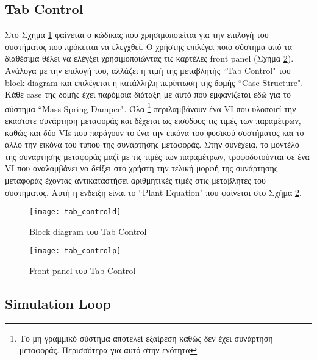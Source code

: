 \subsection{Tab Control}

Στο Σχήμα \ref{fig:tab_controld} φαίνεται ο κώδικας που χρησιμοποιείται για την επιλογή του συστήματος που πρόκειται να ελεγχθεί. Ο χρήστης επιλέγει ποιο σύστημα από τα διαθέσιμα θέλει να ελέγξει χρησιμοποιώντας τις καρτέλες front panel (Σχήμα \ref{fig:tab_controlp}). Ανάλογα με την επιλογή του, αλλάζει η τιμή της μεταβλητής ``Tab Control" του block diagram και επιλέγεται η κατάλληλη περίπτωση της δομής ``Case Structure". Κάθε case της δομής έχει παρόμοια διάταξη με αυτό που εμφανίζεται εδώ για το σύστημα ``Mass-Spring-Damper". Όλα \footnote{Το μη γραμμικό σύστημα αποτελεί εξαίρεση καθώς δεν έχει συνάρτηση μεταφοράς. Περισσότερα για αυτό στην ενότητα } περιλαμβάνουν ένα VI που υλοποιεί την εκάστοτε συνάρτηση μεταφοράς και δέχεται ως εισόδους τις τιμές των παραμέτρων, καθώς και δύο VIs που παράγουν το ένα την εικόνα του φυσικού συστήματος και το άλλο την εικόνα του τύπου της συνάρτησης μεταφοράς. Στην συνέχεια, το μοντέλο της συνάρτησης μεταφοράς μαζί με τις τιμές των παραμέτρων, τροφοδοτούνται σε ένα VI που αναλαμβάνει να δείξει στο χρήστη την τελική μορφή της συνάρτησης μεταφοράς έχοντας αντικαταστήσει αριθμητικές τιμές στις μεταβλητές του συστήματος. Αυτή η ένδειξη είναι το ``Plant Equation" που φαίνεται στο Σχήμα \ref{fig:tab_controlp}.

\begin{figure}[h]
  \centering
  \texttt{[image: tab\_controld]}
  \caption{Block diagram του Tab Control}
  \label{fig:tab_controld}
\end{figure}

\begin{figure}[h]
  \centering
  \texttt{[image: tab\_controlp]}
  \caption{Front panel του Tab Control}
  \label{fig:tab_controlp}
\end{figure}

\subsection{Simulation Loop}

